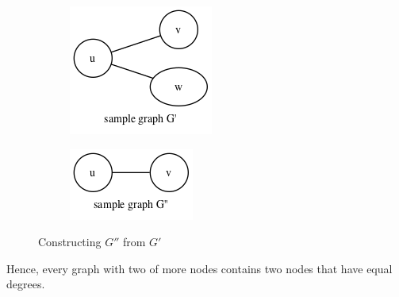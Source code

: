 \documentclass[11pt, oneside]{article}   	%
\begin{document}
\begin{figure}[ht]
\centering
\begin{subfigure}{.5\textwidth}
  \centering
  \includegraphics[width=.4\linewidth]{graphs2}
\end{subfigure}%
\begin{subfigure}{.5\textwidth}
  \centering
  \includegraphics[width=.4\linewidth]{graphs3}
\end{subfigure}
\caption{Constructing $G''$ from $G'$}
\label{fig:test}
\end{figure}


\fi
\par Hence, every graph with two of more nodes contains two nodes that have equal degrees.
\end{document}
